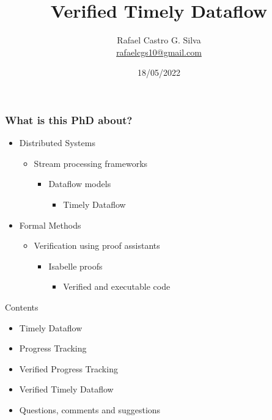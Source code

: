\documentclass{beamer}
\title[Verified Timely Dataflow]{Verified Timely Dataflow}
\author[Rafael Castro]{
  Rafael Castro G. Silva\\\medskip
  {\small \url{rafaelcgs10@gmail.com}}}
\date{18/05/2022}
\institute[UCPH]{
  Computer Science Department \\
  Copenhagen University}
\begin{document}
\begin{frame}
  \titlepage

\end{frame}

\begin{frame}[fragile]
  \frametitle{What is this PhD about?}
  \begin{itemize}
    \item Distributed Systems
          \begin{itemize}
            \item Stream processing frameworks
                  \begin{itemize}
                    \item Dataflow models
                          \begin{itemize}
                            \item Timely Dataflow
                          \end{itemize}
                  \end{itemize}
          \end{itemize}
    \item Formal Methods
          \begin{itemize}
            \item Verification using proof assistants
                  \begin{itemize}
                    \item Isabelle proofs
                          \begin{itemize}
                            \item Verified and executable code
                          \end{itemize}
                  \end{itemize}
          \end{itemize}
  \end{itemize}
\end{frame}

\begin{frame}{Contents}
  \begin{itemize}
    \item Timely Dataflow
    \item Progress Tracking
    \item Verified Progress Tracking
    \item Verified Timely Dataflow
    \item Questions, comments and suggestions
  \end{itemize}
\end{frame}
\end{document}
